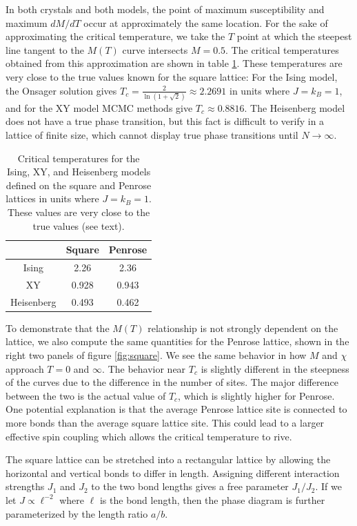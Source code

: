 \documentclass[amsmath,amssymb,aps,twocolumn,nofootinbib]{revtex4-2}
\begin{document}
In both crystals and both models, the point of maximum susceptibility and maximum $dM/dT$ occur at approximately the same location. For the sake of approximating the critical temperature, we take the $T$ point at which the steepest line tangent to the $M(T)$ curve intersects $M=0.5$. The critical temperatures obtained from this approximation are shown in table \ref{tab:tc}. These temperatures are very close to the true values known for the square lattice: For the Ising model, the Onsager solution gives $T_c = \frac{2}{\ln(1 + \sqrt{2})} \approx 2.2691$ in units where $J=k_B=1$, and for the XY model MCMC methods give $T_c \approx 0.8816$. The Heisenberg model does not have a true phase transition, but this fact is difficult to verify in a lattice of finite size, which cannot display true phase transitions until $N\rightarrow \infty$. 
\begin{table}
  \centering
  \begin{tabular}{c|cc}
    \hline \hline
    & Square & Penrose \\ \hline
    Ising & 2.26 & 2.36\\
    XY & 0.928 & 0.943\\
    Heisenberg & 0.493 & 0.462\\ \hline \hline
  \end{tabular}
  \caption{Critical temperatures for the Ising, XY, and Heisenberg models defined on the square and Penrose lattices in units where $J = k_B = 1$. These values are very close to the true values (see text).}
  \label{tab:tc}
\end{table}

To demonstrate that the $M(T)$ relationship is not strongly dependent on the lattice, we also compute the same quantities for the Penrose lattice, shown in the right two panels of figure \ref{fig:square}. We see the same behavior in how $M$ and $\chi$ approach $T=0$ and $\infty$. The behavior near $T_c$ is slightly different in the steepness of the curves due to the difference in the number of sites. The major difference between the two is the actual value of $T_c$, which is slightly higher for Penrose. One potential explanation is that the average Penrose lattice site is connected to more bonds than the average square lattice site. This could lead to a larger effective spin coupling which allows the critical temperature to rive.

The square lattice can be stretched into a rectangular lattice by allowing the horizontal and vertical bonds to differ in length. Assigning different interaction strengths $J_1$ and $J_2$ to the two bond lengths gives a free parameter $J_1/J_2$. If we let $J \propto \ell^{-2}$ where $\ell$ is the bond length, then the phase diagram is further parameterized by the length ratio $a/b$.
\end{document}
